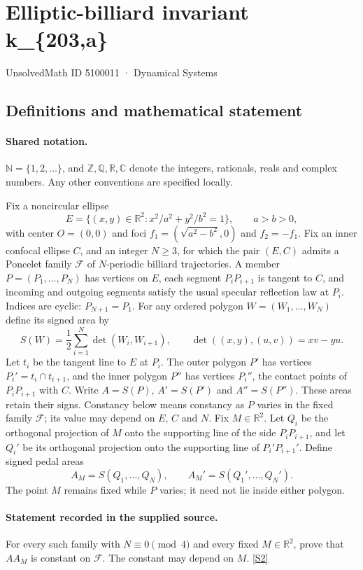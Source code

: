 \documentclass[11pt]{article}
\newcommand{\sref}[2]{\hyperlink{source:#1:#2}{[S#2]}}
\begin{document}
\setcounter{section}{5100010}
\section{Elliptic-billiard invariant k\_\{203,a\}}\label{5100011}
{\small\sffamily UnsolvedMath ID 5100011 · Dynamical Systems}
\subsection{Definitions and mathematical statement}

\paragraph{Shared notation.}$\mathbb N=\{1,2,\ldots\}$, and $\mathbb Z,\mathbb Q,\mathbb R,\mathbb C$ denote the integers, rationals, reals and complex numbers. Any other conventions are specified locally.


Fix a noncircular ellipse
\[
E=\{(x,y)\in\mathbb R^2:x^2/a^2+y^2/b^2=1\},\qquad a>b>0,
\]
with center $O=(0,0)$ and foci $f_1=(\sqrt{a^2-b^2},0)$ and $f_2=-f_1$. Fix an inner confocal ellipse $C$, and an integer $N\geq3$, for which the pair $(E,C)$ admits a Poncelet family $\mathcal F$ of $N$-periodic billiard trajectories. A member $P=(P_1,\ldots,P_N)$ has vertices on $E$, each segment $P_iP_{i+1}$ is tangent to $C$, and incoming and outgoing segments satisfy the usual specular reflection law at $P_i$. Indices are cyclic: $P_{N+1}=P_1$.
For any ordered polygon $W=(W_1,\ldots,W_N)$ define its signed area by
\[
S(W)=\frac12\sum_{i=1}^N\det(W_i,W_{i+1}),\qquad
\det((x,y),(u,v))=xv-yu.
\]
Let $t_i$ be the tangent line to $E$ at $P_i$. The outer polygon $P'$ has vertices $P_i'=t_i\cap t_{i+1}$, and the inner polygon $P''$ has vertices $P_i''$, the contact points of $P_iP_{i+1}$ with $C$. Write $A=S(P)$, $A'=S(P')$ and $A''=S(P'')$. These areas retain their signs. Constancy below means constancy as $P$ varies in the fixed family $\mathcal F$; its value may depend on $E$, $C$ and $N$.
Fix $M\in\mathbb R^2$. Let $Q_i$ be the orthogonal projection of $M$ onto the supporting line of the side $P_iP_{i+1}$, and let $Q_i'$ be its orthogonal projection onto the supporting line of $P_i'P_{i+1}'$. Define signed pedal areas
\[
A_M=S(Q_1,\ldots,Q_N),\qquad A_M'=S(Q_1',\ldots,Q_N').
\]
The point $M$ remains fixed while $P$ varies; it need not lie inside either polygon.
\paragraph{Statement recorded in the supplied source.}
For every such family with $N\equiv0\pmod4$ and every fixed $M\in\mathbb R^2$, prove that $A A_M$ is constant on $\mathcal F$. The constant may depend on $M$. \sref{5100011}{2}
\end{document}
